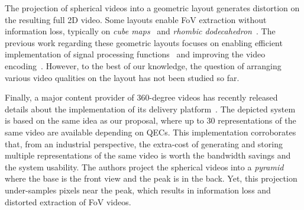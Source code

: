 The projection of spherical videos into a geometric layout generates
distortion on the resulting
full 2D video. Some layouts enable \ac{FoV} extraction without information
loss, typically on \emph{cube maps}~\cite{Ng2005} and
\emph{rhombic dodecahedron}~\cite{fu_rhombic_2009}. The previous work regarding
these
geometric layouts focuses on enabling efficient implementation of signal processing
functions~\cite{kazhdan_metric-aware_2010} and improving the video
encoding~\cite{tosic_low_2009}.
However, to the best of our knowledge, the
question of arranging various video qualities on the layout has not been studied so far.

Finally, a major content provider of 360-degree videos has recently released details about the
implementation of its delivery platform~\cite{facebook}. The depicted system is based
on the same idea as our proposal, where up to 30 representations of the same video are available depending on
\acp{QEC}. This implementation corroborates that, from an industrial perspective, the
extra-cost of
generating and storing multiple representations of the same video is worth the bandwidth
savings and the system usability. The authors project the spherical videos into a \emph{pyramid}
where the
base is the front
view and the peak is in the back. Yet, this projection under-samples pixels near the peak,
which
results in
information loss and distorted extraction of \ac{FoV} videos. 

%
%
%
%


